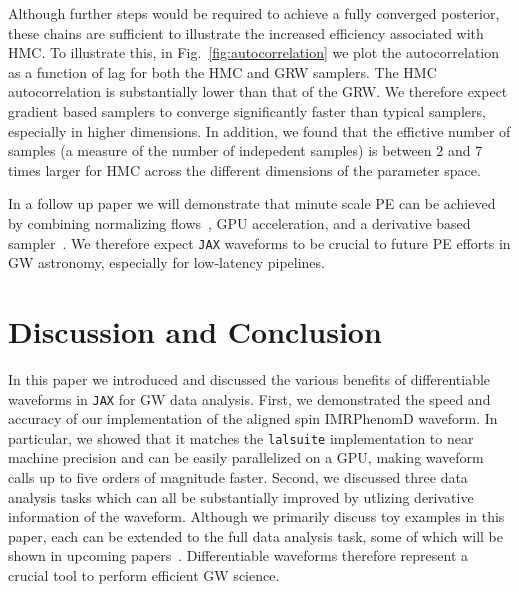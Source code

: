 \documentclass[twocolumn]{aastex631}
\newcommand{\jax}{\texttt{JAX}\xspace}
\newcommand{\lalsuite}{\texttt{lalsuite}\xspace}
\begin{document}
Although further steps would be required to achieve a fully converged posterior, these chains are sufficient to illustrate the increased efficiency associated with HMC. 
To illustrate this, in Fig.~\ref{fig:autocorrelation} we plot the autocorrelation as a function of lag for both the HMC and GRW samplers.
The HMC autocorrelation is substantially lower than that of the GRW.
We therefore expect gradient based samplers to converge significantly faster than typical samplers, especially in higher dimensions.
In addition, we found that the effictive number of samples (a measure of the number of indepedent samples) is between 2 and 7 times larger for HMC across the different dimensions of the parameter space.

In a follow up paper we will demonstrate that minute scale PE can be achieved by combining normalizing flows~\citep{2022arXiv221106397W, Gabrie:2021tlu}, GPU acceleration, and a derivative based sampler~\citep{PEpaper}. We therefore expect \jax waveforms to be crucial to future PE efforts in GW astronomy, especially for low-latency pipelines.



\section{Discussion and Conclusion}
\label{subsec:discussion}

In this paper we introduced and discussed the various benefits of differentiable waveforms in \jax for GW data analysis.
First, we demonstrated the speed and accuracy of our implementation of the aligned spin IMRPhenomD waveform.
In particular, we showed that it matches the \lalsuite implementation to near machine precision and can be easily parallelized on a GPU, making waveform calls up to five orders of magnitude faster.
Second, we discussed three data analysis tasks which can all be substantially improved by utlizing derivative information of the waveform.
Although we primarily discuss toy examples in this paper, each can be extended to the full data analysis task, some of which will be shown in upcoming papers~\citep{PEpaper}.
Differentiable waveforms therefore represent a crucial tool to perform efficient GW science.
\end{document}
